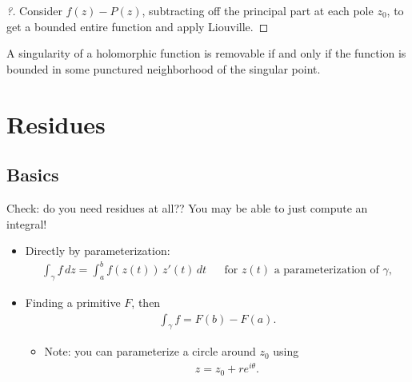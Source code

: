 \begin{proof}[?]

Consider \(f(z) - P(z)\), subtracting off the principal part at each
pole \(z_0\), to get a bounded entire function and apply Liouville.

\end{proof}

\begin{theorem}

A singularity of a holomorphic function is removable if and only if the
function is bounded in some punctured neighborhood of the singular
point.

\end{theorem}

\hypertarget{residues}{%
\section{Residues}\label{residues}}

\hypertarget{basics}{%
\subsection{Basics}\label{basics}}

\begin{remark}

Check: do you need residues at all?? You may be able to just compute an
integral!

\begin{itemize}
\item
  Directly by parameterization:
  \begin{align*}
  \int_\gamma f \,dz= \int_a^b f(z(t))\, z'(t) \,dt&& \text{for } z(t) \text{ a parameterization of } \gamma
  ,\end{align*}
\item
  Finding a primitive \(F\), then
  \begin{align*}
  \int_\gamma f = F(b) - F(a)
  .\end{align*}

  \begin{itemize}
  \tightlist
  \item
    Note: you can parameterize a circle around \(z_0\) using
    \begin{align*}
    z= z_0 + re^{i \theta }
    .\end{align*}
  \end{itemize}
\end{itemize}

\end{remark}


